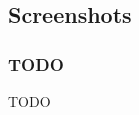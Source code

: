 \documentclass[aspectratio=169]{beamer}
\begin{document}
\subsection{Screenshots}

\begin{frame}
  \frametitle{TODO}

  TODO

\end{frame}

\begin{frame}[plain]
\end{frame}
\end{document}

